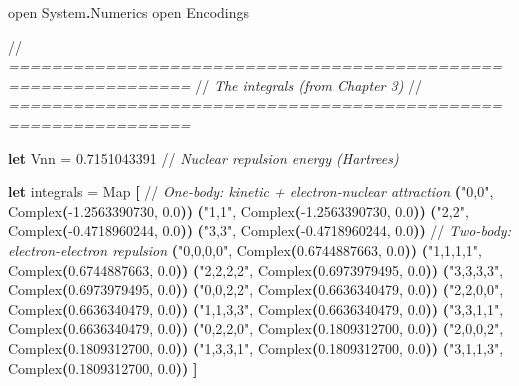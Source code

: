 \documentclass[
  11pt,
  oneside]{book}
\newenvironment{Shaded}{\begin{snugshade}}{\end{snugshade}}
\newcommand{\CommentTok}[1]{\textcolor[rgb]{0.56,0.35,0.01}{\textit{#1}}}
\newcommand{\FloatTok}[1]{\textcolor[rgb]{0.00,0.00,0.81}{#1}}
\newcommand{\KeywordTok}[1]{\textcolor[rgb]{0.13,0.29,0.53}{\textbf{#1}}}
\newcommand{\NormalTok}[1]{#1}
\newcommand{\OperatorTok}[1]{\textcolor[rgb]{0.81,0.36,0.00}{\textbf{#1}}}
\newcommand{\OtherTok}[1]{\textcolor[rgb]{0.56,0.35,0.01}{#1}}
\newcommand{\StringTok}[1]{\textcolor[rgb]{0.31,0.60,0.02}{#1}}
\begin{document}
\begin{Shaded}
\begin{Highlighting}[]
\OtherTok{open}\NormalTok{ System}\KeywordTok{.}\NormalTok{Numerics}
\OtherTok{open}\NormalTok{ Encodings}

\NormalTok{//}\CommentTok{ ===============================================================}
\NormalTok{//}\CommentTok{  The integrals (from Chapter 3)}
\NormalTok{//}\CommentTok{ ===============================================================}

\KeywordTok{let}\NormalTok{ Vnn = }\FloatTok{0.7151043391}\NormalTok{  //}\CommentTok{ Nuclear repulsion energy (Hartrees)}

\KeywordTok{let}\NormalTok{ integrals = Map }\OperatorTok{[}
\NormalTok{    //}\CommentTok{ One{-}body: kinetic + electron{-}nuclear attraction}
    \OperatorTok{(}\StringTok{"0,0"}\NormalTok{, Complex}\OperatorTok{(}\FloatTok{{-}1.2563390730}\NormalTok{, }\FloatTok{0.0}\OperatorTok{))}
    \OperatorTok{(}\StringTok{"1,1"}\NormalTok{, Complex}\OperatorTok{(}\FloatTok{{-}1.2563390730}\NormalTok{, }\FloatTok{0.0}\OperatorTok{))}
    \OperatorTok{(}\StringTok{"2,2"}\NormalTok{, Complex}\OperatorTok{(}\FloatTok{{-}0.4718960244}\NormalTok{, }\FloatTok{0.0}\OperatorTok{))}
    \OperatorTok{(}\StringTok{"3,3"}\NormalTok{, Complex}\OperatorTok{(}\FloatTok{{-}0.4718960244}\NormalTok{, }\FloatTok{0.0}\OperatorTok{))}
\NormalTok{    //}\CommentTok{ Two{-}body: electron{-}electron repulsion}
    \OperatorTok{(}\StringTok{"0,0,0,0"}\NormalTok{, Complex}\OperatorTok{(}\FloatTok{0.6744887663}\NormalTok{, }\FloatTok{0.0}\OperatorTok{))}
    \OperatorTok{(}\StringTok{"1,1,1,1"}\NormalTok{, Complex}\OperatorTok{(}\FloatTok{0.6744887663}\NormalTok{, }\FloatTok{0.0}\OperatorTok{))}
    \OperatorTok{(}\StringTok{"2,2,2,2"}\NormalTok{, Complex}\OperatorTok{(}\FloatTok{0.6973979495}\NormalTok{, }\FloatTok{0.0}\OperatorTok{))}
    \OperatorTok{(}\StringTok{"3,3,3,3"}\NormalTok{, Complex}\OperatorTok{(}\FloatTok{0.6973979495}\NormalTok{, }\FloatTok{0.0}\OperatorTok{))}
    \OperatorTok{(}\StringTok{"0,0,2,2"}\NormalTok{, Complex}\OperatorTok{(}\FloatTok{0.6636340479}\NormalTok{, }\FloatTok{0.0}\OperatorTok{))}
    \OperatorTok{(}\StringTok{"2,2,0,0"}\NormalTok{, Complex}\OperatorTok{(}\FloatTok{0.6636340479}\NormalTok{, }\FloatTok{0.0}\OperatorTok{))}
    \OperatorTok{(}\StringTok{"1,1,3,3"}\NormalTok{, Complex}\OperatorTok{(}\FloatTok{0.6636340479}\NormalTok{, }\FloatTok{0.0}\OperatorTok{))}
    \OperatorTok{(}\StringTok{"3,3,1,1"}\NormalTok{, Complex}\OperatorTok{(}\FloatTok{0.6636340479}\NormalTok{, }\FloatTok{0.0}\OperatorTok{))}
    \OperatorTok{(}\StringTok{"0,2,2,0"}\NormalTok{, Complex}\OperatorTok{(}\FloatTok{0.1809312700}\NormalTok{, }\FloatTok{0.0}\OperatorTok{))}
    \OperatorTok{(}\StringTok{"2,0,0,2"}\NormalTok{, Complex}\OperatorTok{(}\FloatTok{0.1809312700}\NormalTok{, }\FloatTok{0.0}\OperatorTok{))}
    \OperatorTok{(}\StringTok{"1,3,3,1"}\NormalTok{, Complex}\OperatorTok{(}\FloatTok{0.1809312700}\NormalTok{, }\FloatTok{0.0}\OperatorTok{))}
    \OperatorTok{(}\StringTok{"3,1,1,3"}\NormalTok{, Complex}\OperatorTok{(}\FloatTok{0.1809312700}\NormalTok{, }\FloatTok{0.0}\OperatorTok{))}
\OperatorTok{]}


\end{Highlighting}
\end{Shaded}
\end{document}
